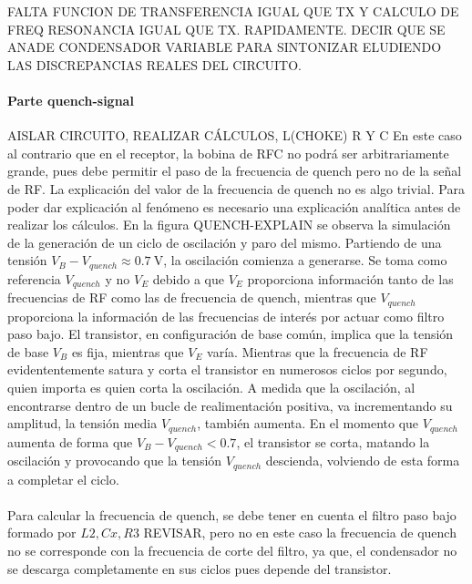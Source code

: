 FALTA FUNCION DE TRANSFERENCIA IGUAL QUE TX Y CALCULO DE FREQ RESONANCIA IGUAL QUE TX. RAPIDAMENTE. DECIR QUE SE ANADE CONDENSADOR VARIABLE PARA SINTONIZAR ELUDIENDO LAS DISCREPANCIAS REALES DEL CIRCUITO.

\paragraph{Parte quench-signal} AISLAR CIRCUITO, REALIZAR C\'ALCULOS, L(CHOKE) R Y C
En este caso al contrario que en el receptor, la bobina de RFC no podrá ser arbitrariamente grande, pues debe permitir el paso de la frecuencia de quench pero no de la señal de RF.
La explicación del valor de la frecuencia de quench no es algo trivial. Para poder dar explicación al fenómeno es necesario una explicación analítica antes de realizar los cálculos.
En la figura QUENCH-EXPLAIN se observa la simulación de la generación de un ciclo de oscilación y paro del mismo. Partiendo de una tensión $V_B - V_{quench} \approx \SI{0.7}{\volt}$, la oscilación comienza a generarse. Se toma como referencia $V_{quench}$ y no $V_E$ debido a que $V_E$ proporciona información tanto de las frecuencias de RF como las de frecuencia de quench, mientras que $V_{quench}$ proporciona la información de las frecuencias de interés por actuar como filtro paso bajo. 
El transistor, en configuración de base común, implica que la tensión de base $V_B$ es fija, mientras que $V_E$ varía. Mientras que la frecuencia de RF evidententemente satura y corta el transistor en numerosos ciclos por segundo, quien importa es quien corta la oscilación. A medida que la oscilación, al encontrarse dentro de un bucle de realimentación positiva, va incrementando su amplitud, la tensión media $V_{quench}$, también aumenta. En el momento que $V_{quench}$ aumenta de forma que $V_B - V_{quench} < 0.7$, el transistor se corta, matando la oscilación y provocando que la tensión $V_{quench}$ descienda, volviendo de esta forma a completar el ciclo.
\paragraph{}
Para calcular la frecuencia de quench, se debe tener en cuenta el filtro paso bajo formado por $L2, Cx, R3$ REVISAR, pero no en este caso la frecuencia de quench no se corresponde con la frecuencia de corte del filtro, ya que, el condensador no se descarga completamente en sus ciclos pues depende del transistor. 

